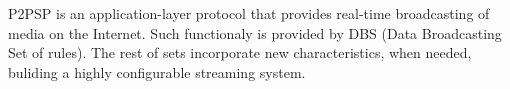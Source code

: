 P2PSP is an application-layer protocol that provides real-time
broadcasting of media on the Internet. Such functionaly is provided by
DBS (Data Broadcasting Set of rules). The rest of sets incorporate new
characteristics, when needed, buliding a highly configurable streaming
system.
